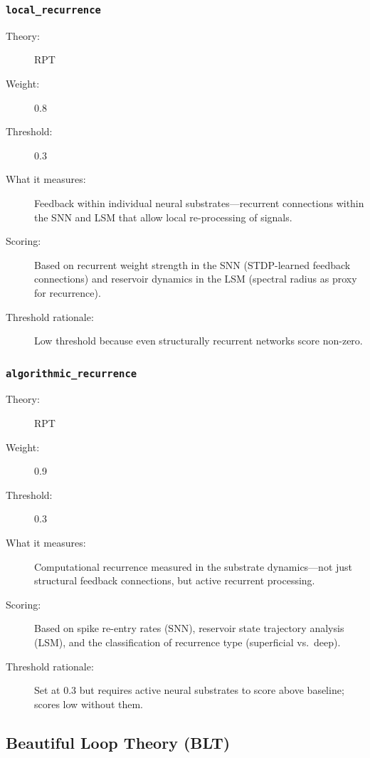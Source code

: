 \subsubsection{\texttt{local\_recurrence}}
\begin{description}
  \item[Theory:] RPT \cite{lamme2006}
  \item[Weight:] 0.8
  \item[Threshold:] 0.3
  \item[What it measures:] Feedback within individual neural substrates---recurrent connections within the SNN and LSM that allow local re-processing of signals.
  \item[Scoring:] Based on recurrent weight strength in the SNN (STDP-learned feedback connections) and reservoir dynamics in the LSM (spectral radius as proxy for recurrence).
  \item[Threshold rationale:] Low threshold because even structurally recurrent networks score non-zero.
\end{description}

\subsubsection{\texttt{algorithmic\_recurrence}}
\begin{description}
  \item[Theory:] RPT
  \item[Weight:] 0.9
  \item[Threshold:] 0.3
  \item[What it measures:] Computational recurrence measured in the substrate dynamics---not just structural feedback connections, but active recurrent processing.
  \item[Scoring:] Based on spike re-entry rates (SNN), reservoir state trajectory analysis (LSM), and the classification of recurrence type (superficial vs.\ deep).
  \item[Threshold rationale:] Set at 0.3 but requires active neural substrates to score above baseline; scores low without them.
\end{description}

\subsection{Beautiful Loop Theory (BLT)}

